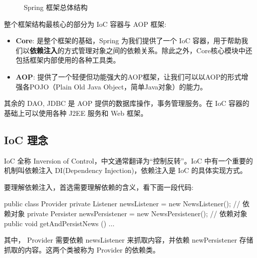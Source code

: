 \begin{figure}[H]
    \caption{Spring 框架总体结构}
    \label{fig:Spring 框架总体结构}
\end{figure}

整个框架结构最核心的部分为 IoC 容器与 AOP 框架:
\begin{itemize}
    \item \textbf{Core}: 是整个框架的基础，Spring 为我们提供了一个 IoC 容器，用于帮助我们以\textbf{依赖注入}的方式管理对象之间的依赖关系。除此之外，Core核心模块中还包括框架内部使用的各种工具类。
    \item \textbf{AOP}: 提供了一个轻便但功能强大的AOP框架，让我们可以以AOP的形式增强各POJO（Plain Old Java Object，简单Java对象）的能力。
\end{itemize}

其余的 DAO, JDBC 是 AOP 提供的数据库操作，事务管理服务。在 IoC 容器的基础上可以使用各种 J2EE 服务和 Web 框架。

\subsection{IoC 理念}

IoC 全称 Inversion of Control，中文通常翻译为“控制反转”。IoC 中有一个重要的机制叫依赖注入 DI(Dependency Injection)，依赖注入是 IoC 的具体实现方式。

要理解依赖注入，首选需要理解依赖的含义，看下面一段代码:

\begin{Java}
public class Provider {
    private Listener newsListener = new NewsListener();      // 依赖对象
    private Persister newsPersistener = new NewsPersistener();   // 依赖对象
    public void getAndPersistNews () {
        ...
    }
}
\end{Java}

其中， Provider 需要依赖 newsListener 来抓取内容，并依赖 newPersistener 存储抓取的内容。这两个类被称为 Provider 的依赖类。

